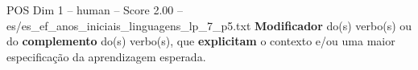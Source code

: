 \begin{textsample}{POS Dim 1 – human – Score 2.00 – es/es\_ef\_anos\_iniciais\_linguagens\_lp\_7\_p5.txt}  \label{ex:f1_pos_004}
\textbf{Modificador} do(s) verbo(s) ou do \textbf{complemento} do(s) verbo(s), que \textbf{explicitam} o contexto e/ou uma maior especificação da aprendizagem esperada.

\end{textsample}

